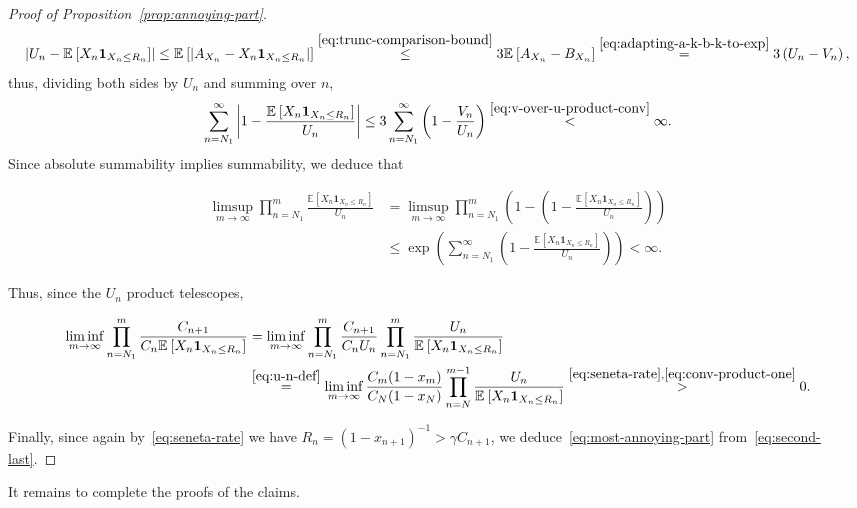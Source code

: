 \documentclass[12pt]{article}
\theoremstyle{definition}
\newcommand{\E}[2][]{\ensuremath{\mathbb{E}_{#1}\left[#2 \right]}}
\begin{document}
\begin{proof}[Proof of Proposition~\ref{prop:annoying-part}]
\[
\left|U_{n} - \E{X_{n} \mathbf{1}_{X_{n} \leq R_{n}}} \right| \leq \E{\left|A_{X_n} - X_{n} \mathbf{1}_{X_{n} \leq R_{n}}\right|} \stackrel{\eqref{eq:trunc-comparison-bound}}{\leq} 3 \E{A_{X_{n}} - B_{X_{n}}} \stackrel{\eqref{eq:adapting-a-k-b-k-to-exp}}{=} 3\left(U_{n} - V_{n}\right),
\]
thus, dividing both sides by $U_n$ and summing over $n$, 
\begin{equation} \label{eq:abs-summ}
 \sum_{n=N_1}^{\infty} \left|1 - \frac{\E{X_{n} \mathbf{1}_{X_{n} \leq R_{n}}}}{U_n} \right| \leq 3 \sum_{n = N_1}^{\infty} \left(1 - \frac{V_n}{U_n}\right) \stackrel{\eqref{eq:v-over-u-product-conv}} < \infty.
\end{equation}
Since absolute summability implies summability, we deduce that 
\begin{linenomath}
\begin{align} \label{eq:conv-product-one}
\nonumber\limsup_{m \to \infty}\prod_{n=N_1}^{m} \frac{\E{X_{n} \mathbf{1}_{X_{n} \leq R_n}}}{U_n} & = \limsup_{m \to \infty}\prod_{n=N_1}^{m}\left(1 -   \left(1 - \frac{\E{X_{n} \mathbf{1}_{X_{n} \leq R_n}}}{U_n}\right) \right) \\ &\leq \exp{\left(\sum_{n=N_1}^{\infty} \left(1 - \frac{\E{X_{n} \mathbf{1}_{X_{n} \leq R_{n}}}}{U_n} \right) \right)} < \infty. 
\end{align}
\end{linenomath}
Thus, since the $U_{n}$ product telescopes, 
\begin{linenomath}
    \begin{align} \label{eq:second-last}
\nonumber        \liminf_{m \to \infty} \prod_{n=N_1}^{m}
\frac{C_{n+1}}{C_n\E{X_{n} \mathbf{1}_{X_{n} \leq R_n}}} & = \liminf_{m \to \infty} \prod_{n=N_1}^{m}\frac{C_{n+1}}{C_n U_n} \prod_{n=N_1}^{m}
\frac{U_n}{\E{X_{n} \mathbf{1}_{X_{n} \leq R_{n}}}}\\
& \stackrel{\eqref{eq:u-n-def}}{=} \liminf_{m \to \infty}
\frac{C_m(1-x_m)}
{C_N(1-x_N)}
\prod_{n=N}^{m-1}
\frac{U_n}{\E{X_{n} \mathbf{1}_{X_{n} \leq R_{n}}}} \stackrel{\eqref{eq:seneta-rate}, \eqref{eq:conv-product-one}}{>} 0.
    \end{align}
\end{linenomath}
Finally, since again by~\eqref{eq:seneta-rate} we have $R_{n} = (1-x_{n+1})^{-1} > \gamma C_{n+1}$, we deduce~\eqref{eq:most-annoying-part} from~\eqref{eq:second-last}. 
\end{proof}
It remains to complete the proofs of the claims. 
\end{document}
